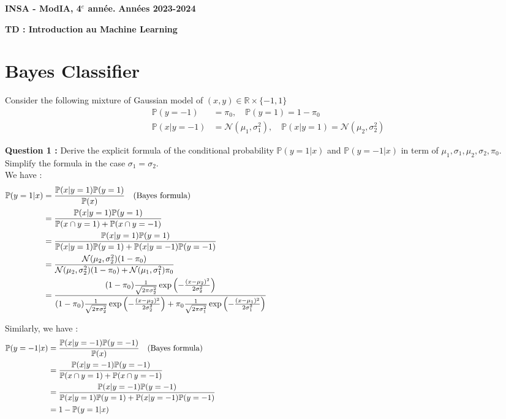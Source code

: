\documentclass[12pt,a4paper]{article}
\newcommand{\entete}{
    \noindent\textbf{INSA - ModIA, 4$^e$ année.}
    \hfill \textbf{Années 2023-2024}
    
    \begin{center}
        \textbf{\LARGE TD : Introduction au Machine Learning}
    \end{center}
}
\begin{document}
\entete

\vspace{0.5cm}

\section{Bayes Classifier}

Consider the following mixture of Gaussian model of $(x, y) \in \mathbb{R} \times \{-1, 1\}$
\begin{align*}
    \mathbb{P}(y = -1) &= \pi_0, \quad \mathbb{P}(y = 1) = 1 - \pi_0 \\
    \mathbb{P}(x | y = -1) &= \mathcal{N}(\mu_1, \sigma_1^2), \quad \mathbb{P}(x | y = 1) = \mathcal{N}(\mu_2, \sigma_2^2)
\end{align*}

\noindent\textbf{Question 1 :} Derive the explicit formula of the conditional probability $\mathbb{P}(y = 1 | x)$ and $\mathbb{P}(y = -1 | x)$ in term of $\mu_1, \sigma_1, \mu_2, \sigma_2, \pi_0$.
Simplify the formula in the case $\sigma_1 = \sigma_2$.\\


\color{blue}
\noindent We have :
\begin{align*}
    \mathbb{P}(y = 1 | x) &= \frac{\mathbb{P}(x | y = 1) \mathbb{P}(y = 1)}{\mathbb{P}(x)} \quad \text{(Bayes formula)} \hspace{14.5cm} \\
    &= \frac{\mathbb{P}(x | y = 1) \mathbb{P}(y = 1)}{\mathbb{P}(x \cap y = 1) + \mathbb{P}(x \cap y = -1)} \\
    &= \frac{\mathbb{P}(x | y = 1) \mathbb{P}(y = 1)}{\mathbb{P}(x | y = 1) \mathbb{P}(y = 1) + \mathbb{P}(x | y = -1) \mathbb{P}(y = -1)} \\
    &= \frac{\mathcal{N}(\mu_2, \sigma_2^2) (1 - \pi_0)}{\mathcal{N}(\mu_2, \sigma_2^2) (1 - \pi_0) + \mathcal{N}(\mu_1, \sigma_1^2) \pi_0} \\
    &= \frac{(1 - \pi_0)\frac{1}{\sqrt{2\pi\sigma_2^2}} \exp\left( -\frac{(x - \mu_2)^2}{2\sigma_2^2} \right)}{(1 - \pi_0)\frac{1}{\sqrt{2\pi\sigma_2^2}} \exp\left( -\frac{(x - \mu_2)^2}{2\sigma_2^2} \right) + \pi_0\frac{1}{\sqrt{2\pi\sigma_1^2}} \exp\left( -\frac{(x - \mu_1)^2}{2\sigma_1^2} \right)} \\
\end{align*}


\noindent Similarly, we have :
\begin{align*}
    \mathbb{P}(y = -1 | x) &= \frac{\mathbb{P}(x | y = -1) \mathbb{P}(y = -1)}{\mathbb{P}(x)} \quad \text{(Bayes formula)} \hspace{14.5cm} \\
    &= \frac{\mathbb{P}(x | y = -1) \mathbb{P}(y = -1)}{\mathbb{P}(x \cap y = 1) + \mathbb{P}(x \cap y = -1)} \\
    &= \frac{\mathbb{P}(x | y = -1) \mathbb{P}(y = -1)}{\mathbb{P}(x | y = 1) \mathbb{P}(y = 1) + \mathbb{P}(x | y = -1) \mathbb{P}(y = -1)} \\
    &= 1 - \mathbb{P}(y = 1 | x) \\
\end{align*}
\end{document}
